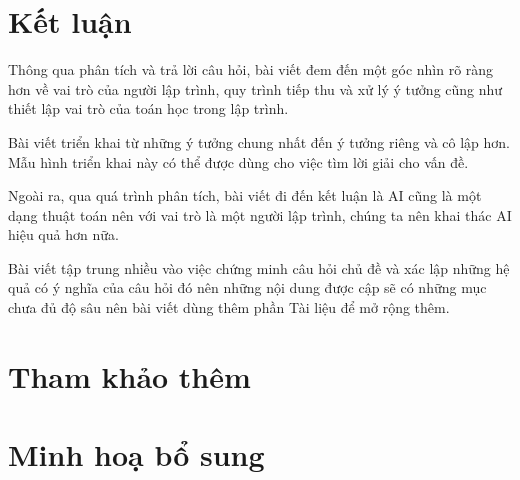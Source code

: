 \documentclass[12pt]{article}
\begin{document}
\section{Kết luận}
	Thông qua phân tích và trả lời câu hỏi, bài viết đem đến một góc nhìn rõ ràng hơn về vai trò của người lập trình, quy trình tiếp thu và xử lý ý tưởng cũng như thiết lập vai trò của toán học trong lập trình.
	
	Bài viết triển khai từ những ý tưởng chung nhất đến ý tưởng riêng và cô lập hơn. Mẫu hình triển khai này có thể được dùng cho việc tìm lời giải cho vấn đề.
	
	Ngoài ra, qua quá trình phân tích, bài viết đi đến kết luận là AI cũng là một dạng thuật toán nên với vai trò là một người lập trình, chúng ta nên khai thác AI hiệu quả hơn nữa.
 	
 	Bài viết tập trung nhiều vào việc chứng minh câu hỏi chủ đề và xác lập những hệ quả có ý nghĩa của câu hỏi đó nên những nội dung được cập sẽ có những mục chưa đủ độ sâu nên bài viết dùng thêm phần Tài liệu để mở rộng thêm.
 
\section{Tham khảo thêm}
\printbibliography

\section{Minh hoạ bổ sung}

\end{document}

